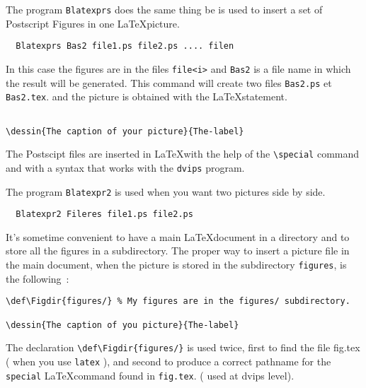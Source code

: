 The program \verb+Blatexprs+ does the same thing be is used to insert
a set of Postscript Figures in one \LaTeX picture.

\begin{verbatim}
  Blatexprs Bas2 file1.ps file2.ps .... filen
\end{verbatim}
In this case the figures are in the files \verb+file<i>+ and
\verb+Bas2+ is a file name in which the result will be generated.
This command will create two files \verb+Bas2.ps+ et \verb+Bas2.tex+.
and the picture is obtained with the \LaTeX statement.
\begin{verbatim}

\dessin{The caption of your picture}{The-label}
\end{verbatim}
The Postscipt files are inserted in \LaTeX with the help of the
\verb+\special+ command and with a syntax that works with the
\verb+dvips+ program.

The program \verb+Blatexpr2+ is used when you want two pictures side
by side.
\begin{verbatim}
  Blatexpr2 Fileres file1.ps file2.ps 
\end{verbatim}
\def\exemple{d7.12}

\dessin{Blatexp2 Example}{\exemple}

It's sometime convenient to have a main \LaTeX document in a directory
and to store all the figures in a subdirectory. The proper way to
insert a  picture file in the main document, when the picture 
is stored in the subdirectory \verb+figures+, is the following~:

\begin{verbatim}
\def\Figdir{figures/} % My figures are in the figures/ subdirectory.

\dessin{The caption of you picture}{The-label}
\end{verbatim}

The declaration \verb+\def\Figdir{figures/}+ is used twice, first to
find the file fig.tex ( when you use \verb+latex+ ), and
 second to produce a correct pathname for the
\verb+special+ \LaTeX command  found in \verb+fig.tex+. ( used at
dvips level).







